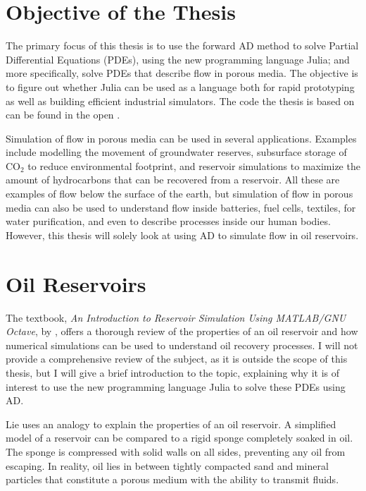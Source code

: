 \section{Objective of the Thesis}
The primary focus of this thesis is to use the forward AD method to solve Partial Differential Equations (PDEs), using the new programming language Julia; and more specifically, solve PDEs that describe flow in porous media. The objective is to figure out whether Julia can be used as a language both for rapid prototyping as well as building efficient industrial simulators. The code the thesis is based on can be found in the open \emph{\citet{Bitbucket}}.

Simulation of flow in porous media can be used in several applications. Examples include modelling the movement of groundwater reserves, subsurface storage of CO$_2$ to reduce environmental footprint, and reservoir simulations to maximize the amount of hydrocarbons that can be recovered from a reservoir. All these are examples of flow below the surface of the earth, but simulation of flow in porous media can also be used to understand flow inside batteries, fuel cells, textiles, for water purification, and even to describe processes inside our human bodies. However, this thesis will solely look at using AD to simulate flow in oil reservoirs.

\section{Oil Reservoirs}
\label{sec:OilReservoirs}
The textbook, \textit{An Introduction to Reservoir Simulation Using MATLAB/GNU Octave}, by \citet{lieMrstUrl}, offers a thorough review of the properties of an oil reservoir and how numerical simulations can be used to understand oil recovery processes. I will not provide a comprehensive review of the subject, as it is outside the scope of this thesis, but I will give a brief introduction to the topic, explaining why it is of interest to use the new programming language Julia to solve these PDEs using AD.

Lie uses an analogy to explain the properties of an oil reservoir. A simplified model of a reservoir can be compared to a rigid sponge completely soaked in oil. The sponge is compressed with solid walls on all sides, preventing any oil from escaping. In reality, oil lies in between tightly compacted sand and mineral particles that constitute a porous medium with the ability to transmit fluids. 

